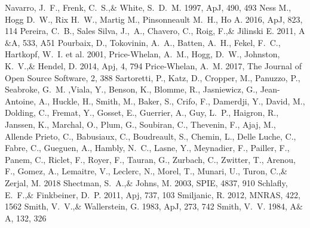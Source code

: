 \documentclass[a4paper,fleqn,usenatbib]{mnras}
\begin{document}
\begin{thebibliography}{99}
Navarro, J.~F., Frenk, C.~S.,\& White, S.~D.~M. 1997, 
ApJ, 490, 493
Ness M., Hogg D.~W., Rix H.~W., Martig M., Pinsonneault M.~H., Ho A. 2016, 
ApJ, 823, 114
Pereira, C.~B., Sales Silva, J.,~A., Chavero, C., Roig, F.,\& Jilinski E. 2011, 
A$\&$A, 533, A51
Pourbaix, D., Tokovinin, A.~A., Batten, A.~H., Fekel, F.~C., Hartkopf, W.~I. et al. 2001, 
Price-Whelan, A.~M., Hogg, D.~W., Johnston, K.~V.,\& Hendel, D. 2014, 
Apj, 4, 794
Price-Whelan, A.~M. 2017, 
The Journal of Open Source Software, 2, 388
Sartoretti, P., Katz, D., Cropper, M., Panuzzo, P., Seabroke, G.~M. ,Viala, Y., Benson, K., Blomme, R., Jasniewicz, G., Jean-Antoine, A., Huckle, H., Smith, M., Baker, S., Crifo, F., Damerdji, Y., David, M., Dolding, C., Fremat, Y., Gosset, E., Guerrier, A., Guy, L.~P., Haigron, R., Janssen, K., Marchal, O., Plum, G., Soubiran, C., Thevenin, F., Ajaj, M., Allende Prieto, C., Babusiaux, C., Boudreault, S., Chemin, L., Delle Luche, C., Fabre, C., Gueguen, A., Hambly, N.~C., Lasne, Y., Meynadier, F., Pailler, F., Panem, C., Riclet, F., Royer, F., Tauran, G., Zurbach, C., Zwitter, T., Arenou, F., Gomez, A., Lemaitre, V., Leclerc, N., Morel, T., Munari, U., Turon, C.,\& Zerjal, M. 2018
Shectman, S.~A.,\& Johns, M. 2003, 
SPIE, 4837, 910
Schlafly, E.~F.,\& Finkbeiner, D.~P. 2011, 
Apj, 737, 103
Smiljanic, R. 2012, 
MNRAS, 422, 1562
Smith, V.~V.,\& Wallerstein, G. 1983, 
ApJ, 273, 742
Smith, V.~V. 1984, 
A$\&$A, 132, 326

\end{thebibliography}
\end{document}
